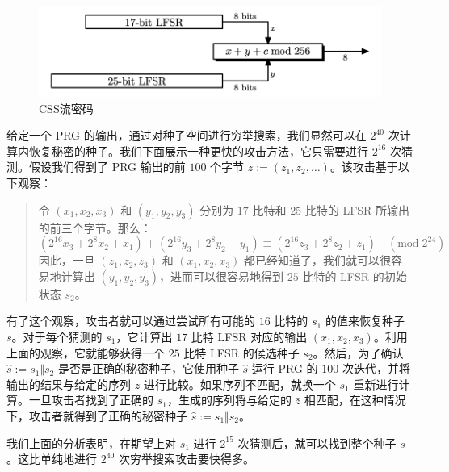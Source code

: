 \begin{figure}
  \centering
  \includegraphics[width=0.6\linewidth]{figures/chapter3/fig11.png}
  \caption{CSS流密码}
  \label{fig:3-11}
\end{figure}

\begin{snote}[CSS的不安全性。]
给定一个 PRG 的输出，通过对种子空间进行穷举搜索，我们显然可以在 $2^{40}$ 次计算内恢复秘密的种子。我们下面展示一种更快的攻击方法，它只需要进行 $2^{16}$ 次猜测。假设我们得到了 PRG 输出的前 $100$ 个字节 $\bar{z}:=(z_1,z_2,\dots)$。该攻击基于以下观察：
\begin{quote}
令 $(x_1,x_2,x_3)$ 和 $(y_1,y_2,y_3)$ 分别为 $17$ 比特和 $25$ 比特的 LFSR 所输出的前三个字节。那么：
\[
(2^{16}x_3+2^8x_2+x_1)+(2^{16}y_3+2^8y_2+y_1)\equiv(2^{16}z_3+2^8z_2+z_1)\quad(\mathrm{mod}\;2^{24})
\]
因此，一旦 $(z_1,z_2,z_3)$ 和 $(x_1,x_2,x_3)$ 都已经知道了，我们就可以很容易地计算出 $(y_1,y_2,y_3)$，进而可以很容易地得到 $25$ 比特的 LFSR 的初始状态 $s_2$。
\end{quote}
有了这个观察，攻击者就可以通过尝试所有可能的 $16$ 比特的 $s_1$ 的值来恢复种子 $s$。对于每个猜测的 $s_1$，它计算出 $17$ 比特 LFSR 对应的输出 $(x_1,x_2,x_3)$。利用上面的观察，它就能够获得一个 $25$ 比特 LFSR 的候选种子 $s_2$。然后，为了确认 $\hat{s}:=s_1\Vert s_2$ 是否是正确的秘密种子，它使用种子 $\hat{s}$ 运行 PRG 的 $100$ 次迭代，并将输出的结果与给定的序列 $\bar{z}$ 进行比较。如果序列不匹配，就换一个 $s_1$ 重新进行计算。一旦攻击者找到了正确的 $s_1$，生成的序列将与给定的 $\bar{z}$ 相匹配，在这种情况下，攻击者就得到了正确的秘密种子 $\hat{s}:=s_1\Vert s_2$。

我们上面的分析表明，在期望上对 $s_1$ 进行 $2^{15}$ 次猜测后，就可以找到整个种子 $s$。这比单纯地进行 $2^{40}$ 次穷举搜索攻击要快得多。
\end{snote}
